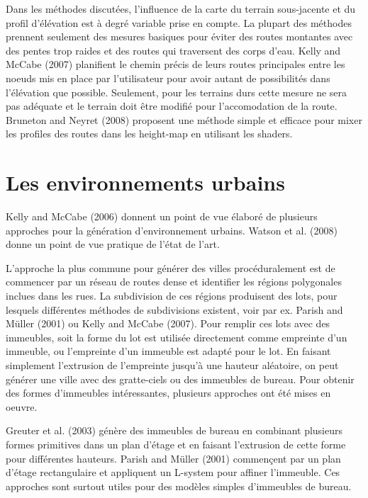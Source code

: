 \documentclass[11pt]{report}
\begin{document}
Dans les méthodes discutées, l'influence de la carte du terrain sous-jacente et du profil d'élévation est à degré variable prise en compte. La plupart des méthodes prennent seulement des mesures basiques pour éviter des routes montantes avec des pentes trop raides et des routes qui traversent des corps d'eau. Kelly and McCabe (2007) planifient le chemin précis de leurs routes principales entre les noeuds mis en place par l'utilisateur pour avoir autant de possibilités dans l'élévation que possible. Seulement, pour les terrains durs cette mesure ne sera pas adéquate et le terrain doit être modifié pour l'accomodation de la route. Bruneton and Neyret (2008) proposent une méthode simple et efficace pour mixer les profiles des routes dans les height-map en utilisant les shaders.

\section{Les environnements urbains}

Kelly and McCabe (2006) donnent un point de vue élaboré de plusieurs approches pour la génération d'environnement urbains. Watson et al. (2008) donne un point de vue pratique de l'état de l'art. \newline

L'approche la plus commune pour générer des villes procéduralement est de commencer par un réseau de routes dense et identifier les régions polygonales inclues dans les rues. La subdivision de ces régions produisent des lots, pour lesquels différentes méthodes de subdivisions existent, voir par ex. Parish and Müller (2001) ou Kelly and McCabe (2007). Pour remplir ces lots avec des immeubles, soit la forme du lot est utilisée directement comme empreinte d'un immeuble, ou l'empreinte d'un immeuble est adapté pour le lot. En faisant simplement l'extrusion de l'empreinte jusqu'à une hauteur aléatoire, on peut générer une ville avec des gratte-ciels ou des immeubles de bureau. Pour obtenir des formes d'immeubles intéressantes, plusieurs approches ont été mises en oeuvre.\newline

Greuter et al. (2003) génère des immeubles de bureau en combinant plusieurs formes primitives dans un plan d'étage et en faisant l'extrusion de cette forme pour différentes hauteurs. Parish and Müller (2001) commençent par un plan d'étage rectangulaire et appliquent un L-system pour affiner l'immeuble. Ces approches sont surtout utiles pour des modèles simples d'immeubles de bureau.  \newline
\end{document}
